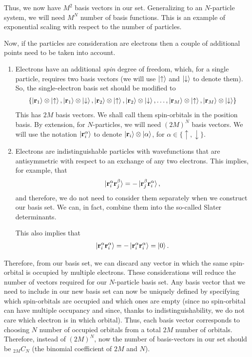 \documentclass[12pt,oneside]{book}
\begin{document}
Thus, we now have $M^2$ basis vectors in our set. Generalizing to an $N$-particle system, we will need $M^N$ number of basis functions. This is an example of exponential scaling with respect to the number of particles.

Now, if the particles are consideration are electrons then a couple of additional points need to be taken into account.
\begin{enumerate}
    \item Electrons have an additional \textit{spin} degree of freedom, which, for a single particle, requires two basis vectors (we will use $\ket{\uparrow}$ and $\ket{\downarrow}$ to denote them). So, the single-electron basis set should be modified to 
    \begin{align*}
        \{\ket{\mathbf{r}_1}\otimes\ket{\uparrow}, \ket{\mathbf{r}_1}\otimes\ket{\downarrow}, \ket{\mathbf{r}_2}\otimes\ket{\uparrow}, \ket{\mathbf{r}_2}\otimes\ket{\downarrow},\hdots, \ket{\mathbf{r}_M}\otimes\ket{\uparrow}, \ket{\mathbf{r}_M}\otimes\ket{\downarrow}\}
    \end{align*}
    This has $2M$ basis vectors.  We shall call them spin-orbitals in the position basis. By extension, for $N$-particles, we will need $(2M)^N$ basis vectors. We will use the notation $\ket{\mathbf{r}_i^\alpha}$ to denote $\ket{\mathbf{r}_i}\otimes\ket{\alpha}$, for $\alpha \in \{\uparrow,\downarrow\}$.
    \item Electrons are indistinguishable particles with wavefunctions that are antisymmetric with respect to an exchange of any two electrons. This implies, for example, that
    \begin{align}
        \ket{\mathbf{r}_i^\alpha\mathbf{r}_j^\beta} = -\ket{\mathbf{r}_j^\beta\mathbf{r}_i^\alpha},
    \end{align}
    and therefore, we do not need to consider them separately when we construct our basis set. We can, in fact, combine them into the so-called Slater determinants.

    This also implies that
\begin{align}
\ket{\mathbf{r}_i^\alpha\mathbf{r}_i^\alpha}=-\ket{\mathbf{r}_i^\alpha\mathbf{r}_i^\alpha}=\ket{0}.
\end{align}

\end{enumerate}

Therefore, from our basis set, we can discard any vector in which the same spin-orbital is occupied by multiple electrons. These considerations will reduce the number of vectors required for our $N$-particle basis set. Any basis vector that we need to include in our new basis set can now be uniquely defined by specifying which spin-orbitals are occupied and which ones are empty (since no spin-orbital can have multiple occupancy and since, thanks to indistinguishability, we do not care which electron is in which orbital). Thus, each basis vector corresponds to choosing $N$ number of occupied orbitals from a total $2M$ number of orbitals. Therefore, instead of $(2M)^N$, now the number of basis-vectors in our set should be $_{2M}C_N$ (the binomial coefficient of $2M$ and $N$). 
\end{document}
